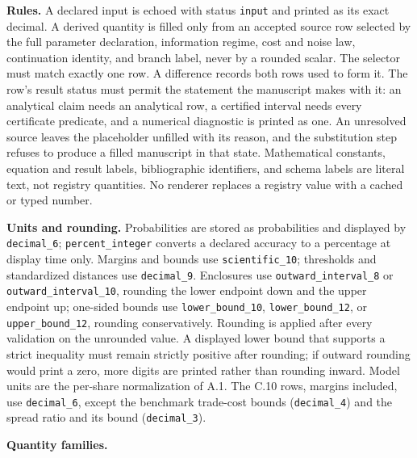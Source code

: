 \documentclass[
  11pt,
]{article}
\begin{document}
\textbf{Rules.} A declared input is echoed with status \texttt{input}
and printed as its exact decimal. A derived quantity is filled only from
an accepted source row selected by the full parameter declaration,
information regime, cost and noise law, continuation identity, and
branch label, never by a rounded scalar. The selector must match exactly
one row. A difference records both rows used to form it. The row's
result status must permit the statement the manuscript makes with it: an
analytical claim needs an analytical row, a certified interval needs
every certificate predicate, and a numerical diagnostic is printed as
one. An unresolved source leaves the placeholder unfilled with its
reason, and the substitution step refuses to produce a filled manuscript
in that state. Mathematical constants, equation and result labels,
bibliographic identifiers, and schema labels are literal text, not
registry quantities. No renderer replaces a registry value with a cached
or typed number.

\textbf{Units and rounding.} Probabilities are stored as probabilities
and displayed by \texttt{decimal\_6}; \texttt{percent\_integer} converts
a declared accuracy to a percentage at display time only. Margins and
bounds use \texttt{scientific\_10}; thresholds and standardized
distances use \texttt{decimal\_9}. Enclosures use
\texttt{outward\_interval\_8} or \texttt{outward\_interval\_10},
rounding the lower endpoint down and the upper endpoint up; one-sided
bounds use \texttt{lower\_bound\_10}, \texttt{lower\_bound\_12}, or
\texttt{upper\_bound\_12}, rounding conservatively. Rounding is applied
after every validation on the unrounded value. A displayed lower bound
that supports a strict inequality must remain strictly positive after
rounding; if outward rounding would print a zero, more digits are
printed rather than rounding inward. Model units are the per-share
normalization of A.1. The C.10 rows, margins included, use
\texttt{decimal\_6}, except the benchmark trade-cost bounds
(\texttt{decimal\_4}) and the spread ratio and its bound
(\texttt{decimal\_3}).

\textbf{Quantity families.}
\end{document}

